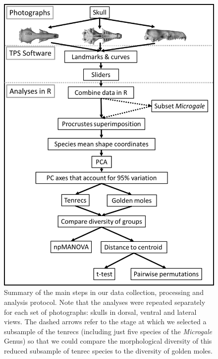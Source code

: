 \documentclass[12pt,a4paper]{article}
\begin{document}
	\begin{figure}[!htbp]
	\centering
	\includegraphics[width=1\linewidth,height=0.8\textheight]{figures/methods_flowchart_paper.png}
		
	\caption[Flowchart diagram of data collection and analysis]
		{Summary of the main steps in our data collection, processing and analysis protocol. Note that the analyses were repeated separately for each set of photographs: skulls in dorsal, ventral and lateral views. The dashed arrows refer to the stage at which we selected a subsample of the tenrecs (including just five species of the \textit{Microgale} Genus) so that we could compare the morphological diversity of this reduced subsample of tenrec species to the diversity of golden moles.}		
		\label{fig:flow}
		\end{figure}
\end{document}
